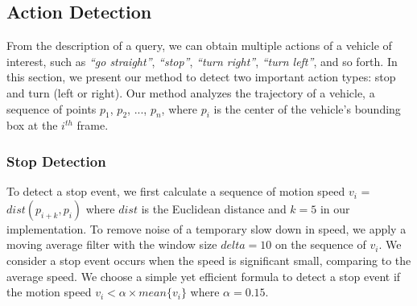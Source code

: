 \subsection{Action Detection}
\label{sec:action_detection}
From the description of a query, we can obtain multiple actions of a vehicle of interest, such as \textit{``go straight''}, \textit{``stop''}, \textit{``turn right''}, \textit{``turn left''}, and so forth. In this section, we present our method to detect two important action types: stop and turn (left or right). Our method analyzes the trajectory of a vehicle, a sequence of points $p_1$, $p_2$, ..., $p_n$, where $p_i$ is the center of the vehicle's bounding box at the $i^{th}$ frame.
\subsubsection{Stop Detection}
To detect a stop event, we first calculate a sequence of motion speed $v_i$ = $dist(p_{i+k}, p_i)$ where $dist$ is the Euclidean distance and $k = 5$ in our implementation. To remove noise of a temporary slow down in speed, we apply a moving average filter with the window size $delta = 10$ on the sequence of $v_i$. We consider a stop event occurs when the speed is significant small, comparing to the average speed. We choose a simple yet efficient formula to detect a stop event if the motion speed $v_i < \alpha \times mean\{v_i\}$ where $\alpha = 0.15$.

